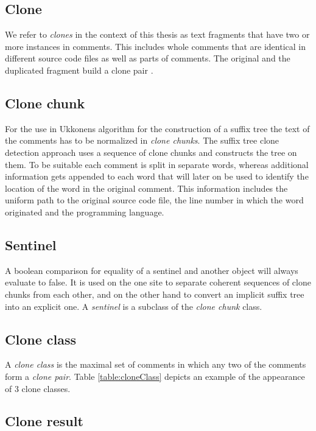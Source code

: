 \subsection{Clone}
We refer to \textit{clones} in the context of this thesis as text fragments that have two or more instances in comments. This includes whole comments that are identical in different source code files as well as parts of comments. The original and the duplicated fragment build a clone pair \cite{Roy2007}. 

\subsection{Clone chunk}
For the use in Ukkonens algorithm for the construction of a suffix tree \cite{Ukkonen1995} the text of the comments has to be normalized in \textit{clone chunks}. The suffix tree clone detection approach uses a sequence of clone chunks and constructs the tree on them. To be suitable each comment is split in separate words, whereas additional information gets appended to each word that will later on be used to identify the location of the word in the original comment. This information includes the uniform path to the original source code file, the line number in which the word originated and the programming language.

\subsection{Sentinel}
A boolean comparison for equality of a sentinel and another object will always evaluate to false. It is used on the one site to separate coherent sequences of clone chunks from each other, and on the other hand to convert an implicit suffix tree into an explicit one. A \textit{sentinel} is a subclass of the \textit{clone chunk} class. 

\subsection{Clone class}
A \textit{clone class} is the maximal set of comments in which any two of the comments form a \textit{clone pair}.
Table \ref{table:cloneClass} depicts an example of the appearance of 3
clone classes.


\subsection{Clone result}




